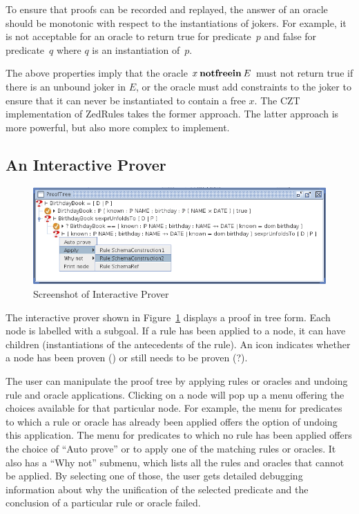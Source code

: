 \documentclass{entcs}
\begin{document}
To ensure that proofs can be recorded and replayed, the answer of an
oracle should be monotonic with respect to the instantiations of
jokers.  For example, it is not acceptable for an oracle to return
true for predicate~$p$ and false for predicate~$q$ where $q$ is an
instantiation of~$p$.

The above properties imply that the oracle $x \mathbin{\mathop{\mathstrut{\mbox{\textbf{notfreein}}}}\nolimits} E$ must not
return true if there is an unbound joker in $E$, or the oracle must
add constraints to the joker to ensure that it can never be
instantiated to contain a free $x$.  The CZT implementation of
ZedRules takes the former approach.  The latter approach is more
powerful, but also more complex to implement.


\subsection{An Interactive Prover}

\begin{figure}[htbp]
  \centering
  \includegraphics[width=\textwidth]{cztprover1}
  \caption{Screenshot of Interactive Prover}
  \label{fig:cztprover}
\end{figure}

The interactive prover shown in Figure~\ref{fig:cztprover} displays a
proof in tree form.  Each node is labelled with a subgoal.  If a rule
has been applied to a node, it can have children (instantiations of
the antecedents of the rule).  An icon indicates whether a node has
been proven () or still needs to be proven (?).

The user can manipulate the proof tree by applying rules or oracles
and undoing rule and oracle applications.  Clicking on a node will pop
up a menu offering the choices available for that particular node.
For example, the menu for predicates to which a rule or oracle has
already been applied offers the option of undoing this application.
The menu for predicates to which no rule has been applied offers the
choice of ``Auto prove'' or to apply one of the matching rules or
oracles.  It also has a ``Why not'' submenu, which lists all the rules
and oracles that cannot be applied.  By selecting one of those, the
user gets detailed debugging information about why the unification of
the selected predicate and the conclusion of a particular rule or
oracle failed.
\end{document}
